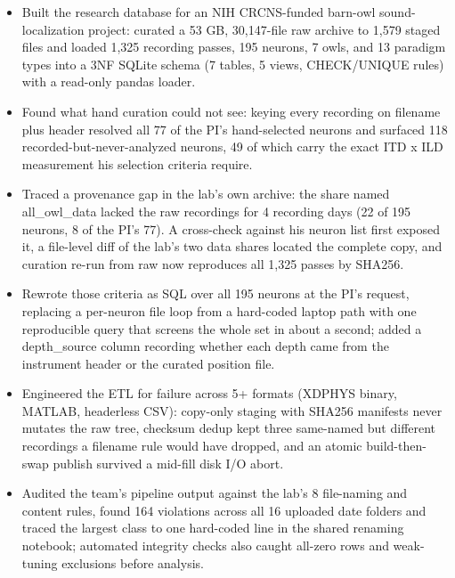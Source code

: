 \documentclass[letterpaper,10pt]{article}
\begin{document}
\begin{itemize}
  \item Built the research database for an NIH CRCNS-funded barn-owl sound-localization project: curated a 53 GB, 30,147-file raw archive to 1,579 staged files and loaded 1,325 recording passes, 195 neurons, 7 owls, and 13 paradigm types into a 3NF SQLite schema (7 tables, 5 views, CHECK/UNIQUE rules) with a read-only pandas loader.
  \item Found what hand curation could not see: keying every recording on filename plus header resolved all 77 of the PI's hand-selected neurons and surfaced 118 recorded-but-never-analyzed neurons, 49 of which carry the exact ITD x ILD measurement his selection criteria require.
  \item Traced a provenance gap in the lab's own archive: the share named all\_owl\_data lacked the raw recordings for 4 recording days (22 of 195 neurons, 8 of the PI's 77). A cross-check against his neuron list first exposed it, a file-level diff of the lab's two data shares located the complete copy, and curation re-run from raw now reproduces all 1,325 passes by SHA256.
  \item Rewrote those criteria as SQL over all 195 neurons at the PI's request, replacing a per-neuron file loop from a hard-coded laptop path with one reproducible query that screens the whole set in about a second; added a depth\_source column recording whether each depth came from the instrument header or the curated position file.
  \item Engineered the ETL for failure across 5+ formats (XDPHYS binary, MATLAB, headerless CSV): copy-only staging with SHA256 manifests never mutates the raw tree, checksum dedup kept three same-named but different recordings a filename rule would have dropped, and an atomic build-then-swap publish survived a mid-fill disk I/O abort.
  \item Audited the team's pipeline output against the lab's 8 file-naming and content rules, found 164 violations across all 16 uploaded date folders and traced the largest class to one hard-coded line in the shared renaming notebook; automated integrity checks also caught all-zero rows and weak-tuning exclusions before analysis.
\end{itemize}
\vspace{2pt}

\newpage
\end{document}
